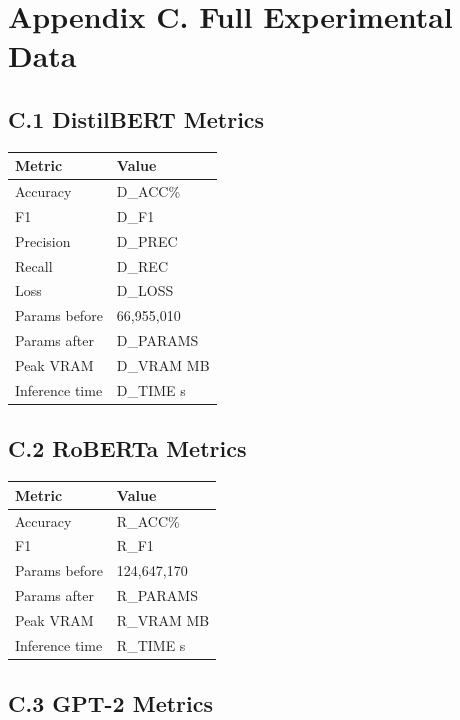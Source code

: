 
\section{Appendix C. Full Experimental Data}

\subsection{C.1 DistilBERT Metrics}

\begin{table}[H]
\centering
\small
\begin{tabular}{ll}
\toprule
\textbf{Metric} & \textbf{Value} \\
\midrule
Accuracy & {{D\_ACC}}\% \\
F1 & {{D\_F1}} \\
Precision & {{D\_PREC}} \\
Recall & {{D\_REC}} \\
Loss & {{D\_LOSS}} \\
Params before & 66,955,010 \\
Params after & {{D\_PARAMS}} \\
Peak VRAM & {{D\_VRAM}} MB \\
Inference time & {{D\_TIME}} s \\
\bottomrule
\end{tabular}
\end{table}

\subsection{C.2 RoBERTa Metrics}

\begin{table}[H]
\centering
\small
\begin{tabular}{ll}
\toprule
\textbf{Metric} & \textbf{Value} \\
\midrule
Accuracy & {{R\_ACC}}\% \\
F1 & {{R\_F1}} \\
Params before & 124,647,170 \\
Params after & {{R\_PARAMS}} \\
Peak VRAM & {{R\_VRAM}} MB \\
Inference time & {{R\_TIME}} s \\
\bottomrule
\end{tabular}
\end{table}

\subsection{C.3 GPT-2 Metrics}

